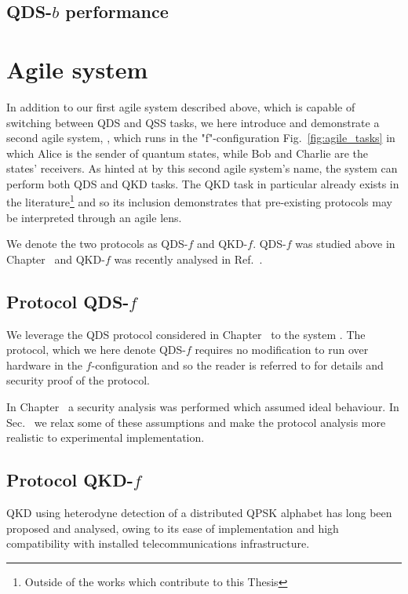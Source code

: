 \subsection{QDS-$b$ performance}

\section{Agile system \systemF}

In addition to our first agile system described above, which is capable of switching between QDS and QSS tasks, we here introduce and demonstrate a second agile system, \systemF, which runs in the "f"-configuration Fig.~\ref{fig:agile_tasks} in which Alice is the sender of quantum states, while Bob and Charlie are the states' receivers. As hinted at by this second agile system's name, the system can perform both QDS and QKD tasks. The QKD task in particular already exists in the literature\footnote{Outside of the works which contribute to this Thesis} and so its inclusion demonstrates that pre-existing protocols may be interpreted through an agile lens.

We denote the two protocols as QDS-$f$ and QKD-$f$. QDS-$f$ was studied above in Chapter~ and QKD-$f$ was recently analysed in Ref.~\cite{Papanastasiou2018}.


\subsection{Protocol QDS-$f$}
We leverage the QDS protocol considered in Chapter~ to the system \systemF. The protocol, which we here denote QDS-$f$ requires no modification to run over hardware in the $f$-configuration and so the reader is referred to  for details and security proof of the protocol. 

In Chapter~ a security analysis was performed which assumed ideal behaviour. In Sec.~ we relax some of these assumptions and make the protocol analysis more realistic to experimental implementation.

\subsection{Protocol QKD-$f$}
QKD using heterodyne detection of a distributed QPSK alphabet has long been proposed and analysed, owing to its ease of implementation and high compatibility with installed telecommunications infrastructure. 

